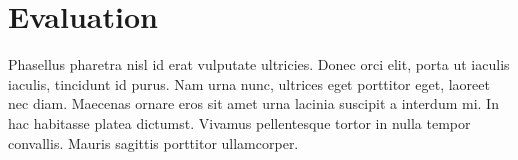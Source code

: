 \section{Evaluation}
Phasellus pharetra nisl id erat vulputate ultricies. Donec orci elit, porta ut iaculis iaculis, tincidunt id purus. Nam urna nunc, ultrices eget porttitor eget, laoreet nec diam. Maecenas ornare eros sit amet urna lacinia suscipit a interdum mi. In hac habitasse platea dictumst. Vivamus pellentesque tortor in nulla tempor convallis. Mauris sagittis porttitor ullamcorper.